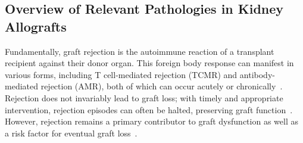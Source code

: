 \subsection{Overview of Relevant Pathologies in Kidney Allografts}


Fundamentally, graft rejection is the autoimmune reaction of a transplant recipient against their donor organ. This foreign body response can manifest in various forms, including T cell-mediated rejection (TCMR) and antibody-mediated rejection (AMR), both of which can occur acutely or chronically~\cite{nankivell_Rejection_2010,loupy_Banff_2020,schinstock_Banff_2019}. Rejection does not invariably lead to graft loss; with timely and appropriate intervention, rejection episodes can often be halted, preserving graft function~\cite{callemeyn_Revisiting_2021,callemeyn_Allorecognition_2022}. However, rejection remains a primary contributor to graft dysfunction as well as a risk factor for eventual graft loss~\cite{poggio_Longterm_2021,hariharan_LongTerm_2021}.
  

